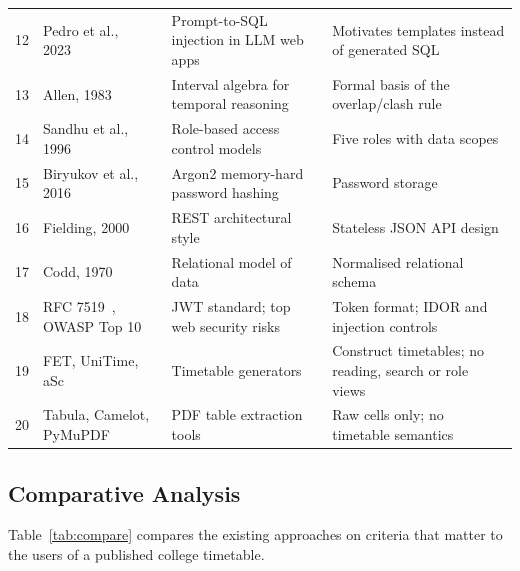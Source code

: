\begin{longtable}{@{}p{0.6cm}p{3.6cm}p{5.4cm}p{5.6cm}@{}}
12 & Pedro et al., 2023~\cite{pedro2023} & Prompt-to-SQL injection in LLM web apps & Motivates templates instead of generated SQL\\
13 & Allen, 1983~\cite{allen1983} & Interval algebra for temporal reasoning & Formal basis of the overlap/clash rule\\
14 & Sandhu et al., 1996~\cite{sandhu1996} & Role-based access control models & Five roles with data scopes\\
15 & Biryukov et al., 2016~\cite{biryukov2016} & Argon2 memory-hard password hashing & Password storage\\
16 & Fielding, 2000~\cite{fielding2000} & REST architectural style & Stateless JSON API design\\
17 & Codd, 1970~\cite{codd1970} & Relational model of data & Normalised relational schema\\
18 & RFC 7519~\cite{rfc7519}, OWASP Top 10~\cite{owasp2021} & JWT standard; top web security risks & Token format; IDOR and injection controls\\
19 & FET, UniTime, aSc~\cite{fet,unitime,asc} & Timetable generators & Construct timetables; no reading, search or role views\\
20 & Tabula, Camelot, PyMuPDF~\cite{tabula,camelot,pymupdf} & PDF table extraction tools & Raw cells only; no timetable semantics\\
\bottomrule
\end{longtable}

\subsection{Comparative Analysis}
Table~\ref{tab:compare} compares the existing approaches on criteria that matter to the users of a
published college timetable.

